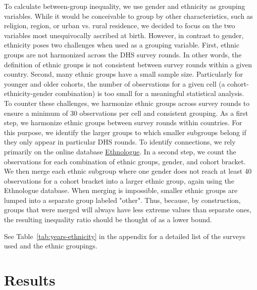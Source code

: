 To calculate between-group inequality, we use gender and ethnicity as grouping variables. While it would be conceivable to group by other characteristics, such as religion, region, or urban vs. rural residence, we decided to focus on the two variables most unequivocally ascribed at birth. However, in contrast to gender, ethnicity poses two challenges when used as a grouping variable. First, ethnic groups are not harmonized across the DHS survey rounds. In other words, the definition of ethnic groups is not consistent between survey rounds within a given country. Second, many ethnic groups have a small sample size. Particularly for younger and older cohorts, the number of observations for a given cell (a cohort-ethnicity-gender combination) is too small for a meaningful statistical analysis. To counter these challenges, we harmonize ethnic groups across survey rounds to ensure a minimum of 30 observations per cell and consistent grouping. As a first step, we harmonize ethnic groups between survey rounds within countries. For this purpose, we identify the larger groups to which smaller subgroups belong if they only appear in particular DHS rounds. To identify connections, we rely primarily on the online database \href{https://www.ethnologue.com/}{Ethnologue}. In a second step, we count the observations for each combination of ethnic groups, gender, and cohort bracket. We then merge each ethnic subgroup where one gender does not reach at least 40 observations for a cohort bracket into a larger ethnic group, again using the Ethnologue database. When merging is impossible, smaller ethnic groups are lumped into a separate group labeled "other". Thus, because, by construction, groups that were merged will always have less extreme values than separate ones, the resulting inequality ratio should be thought of as a lower bound. 

See Table~\ref{tab:years-ethnicity} in the appendix for a detailed list of the surveys used and the ethnic groupings. %

\hypertarget{results}{%
\section{Results}\label{sec:results_ed}}

